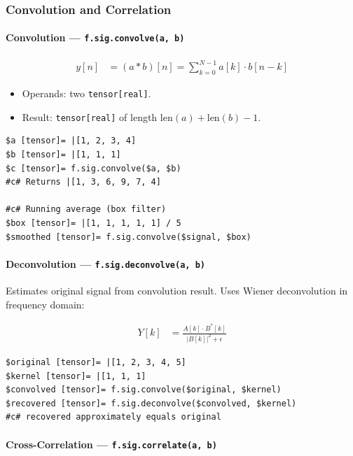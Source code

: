 \subsubsection{Convolution and Correlation}

\paragraph{Convolution --- \texttt{f.sig.convolve(a, b)}}

\begin{align}
y[n] &= (a * b)[n] = \sum_{k=0}^{N-1} a[k] \cdot b[n-k] \label{eq:sig-convolve}
\end{align}

\begin{itemize}
\item Operands: two \texttt{tensor[real]}.
\item Result: \texttt{tensor[real]} of length $\text{len}(a) + \text{len}(b) - 1$.
\end{itemize}

\begin{verbatim}
$a [tensor]= |[1, 2, 3, 4]
$b [tensor]= |[1, 1, 1]
$c [tensor]= f.sig.convolve($a, $b)
#c# Returns |[1, 3, 6, 9, 7, 4]

#c# Running average (box filter)
$box [tensor]= |[1, 1, 1, 1, 1] / 5
$smoothed [tensor]= f.sig.convolve($signal, $box)
\end{verbatim}

\paragraph{Deconvolution --- \texttt{f.sig.deconvolve(a, b)}}
Estimates original signal from convolution result. Uses Wiener deconvolution in frequency domain:

\begin{align}
Y[k] &= \frac{A[k] \cdot B^*[k]}{|B[k]|^2 + \epsilon} \label{eq:sig-deconvolve}
\end{align}

\begin{verbatim}
$original [tensor]= |[1, 2, 3, 4, 5]
$kernel [tensor]= |[1, 1, 1]
$convolved [tensor]= f.sig.convolve($original, $kernel)
$recovered [tensor]= f.sig.deconvolve($convolved, $kernel)
#c# recovered approximately equals original
\end{verbatim}

\paragraph{Cross-Correlation --- \texttt{f.sig.correlate(a, b)}}

